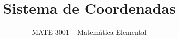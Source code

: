 \documentclass[12pt]{article}
\newcommand{\coursecode}{MATE 3001}      %
\newcommand{\coursename}{Matemática Elemental}     %
\newcommand{\lessontitle}{Sistema de Coordenadas}    %
\newif\ifshowsolutions
\begin{document}
\title{\lessontitle}
\author{\coursecode\ - \coursename}
\date{}
\maketitle

\setcounter{section}{9}




\ifshowsolutions
    \newpage
    \section*{Soluciones}
    
\fi
\end{document}
